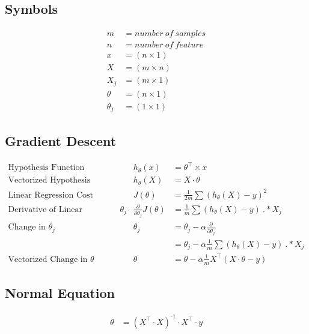 \documentclass[11pt, oneside]{article}
\begin{document}
\subsection{Symbols}
	\begin{align*}
		m &= number\ of\ samples\\
		n &= number\ of\ feature\\
		x &= (n \times 1)\\
		X &= (m \times n)\\
		X_j &= (m \times 1)\\
		\theta &= (n \times 1)\\
		\theta_j &= (1 \times 1)
	\end{align*}

\subsection{Gradient Descent}
	\begin{align*}
		\text{Hypothesis Function} && 
			h_\theta(x) &= \theta^\intercal \times x\\
		\text{Vectorized Hypothesis Function} && 
			h_\theta(X) &= X \cdot \theta \\
		\text{Linear Regression Cost Function} && 
			J(\theta) &= \frac{1}{2 m} \sum (h_\theta(X) - y)^2 \\
		\text{Derivative of Linear Regression CF wrt $\theta_j$} && 
			\frac{\partial}{\partial \theta_j} J(\theta) &= \frac{1}{m} \sum (h_\theta(X) - y)\ .* X_j \\
		\text{Change in $\theta_j$} &&
			\theta_j &= \theta_j - \alpha \frac{\partial}{\partial \theta_j} \\
		\text{} &&
			&= \theta_j - \alpha \frac{1}{m} \sum (h_\theta(X) - y)\ .* X_j \\
		\text{Vectorized Change in $\theta$} &&
			\theta &= \theta - \alpha \frac{1}{m} X^\intercal (X \cdot \theta - y) 
	\end{align*}

\subsection{Normal Equation}
	\begin{align*}
		\theta &= (X^\intercal \cdot X)^\text{-1} \cdot X^\intercal \cdot y
	\end{align*}

\newpage



\end{document}
